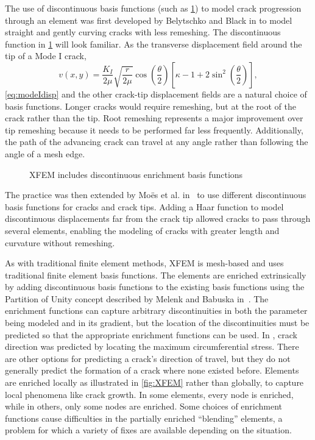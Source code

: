 The use of discontinuous basis functions (such as \cref{fig:CrackEnrich}) to model crack progression through an element was first developed by Belytschko and Black in \cite{belytschko1999elastic} to model straight and gently curving cracks with less remeshing.
The discontinuous function in \cref{fig:CrackEnrich} will look familiar.
As the transverse displacement field around the tip of a Mode I crack,
\begin{equation}
\label{eq:modeIdisp}
v(x,y)=\frac{K_I}{2\mu}\sqrt{\frac{r}{2\mu}}\cos\left(\frac{\theta}{2}\right)\left[\kappa-1+2\sin^2\left(\frac{\theta}{2}\right)\right],
\end{equation}
\cref{eq:modeIdisp} and the other crack-tip displacement fields are a natural choice of basis functions.
Longer cracks would require remeshing, but at the root of the crack rather than the tip.
Root remeshing represents a major improvement over tip remeshing because it needs to be performed far less frequently.
Additionally, the path of the advancing crack can travel at any angle rather than following the angle of a mesh edge.
\begin{figure}[h]
  \centering
  \scalebox{.55}{}
  \caption{XFEM includes discontinuous enrichment basis functions}
  \label{fig:CrackEnrich}
\end{figure}
The practice was then extended by Mo\"es et al. in~\cite{dolbow1999finite} to use different discontinuous basis functions for cracks and crack tips.
Adding a Haar function to model discontinuous displacements far from the crack tip allowed cracks to pass through several elements, enabling the modeling of cracks with greater length and curvature without remeshing.

As with traditional finite element methods, XFEM is mesh-based and uses traditional finite element basis functions.
The elements are enriched extrinsically by adding discontinuous basis functions to the existing basis functions using the Partition of Unity concept described by Melenk and Babuska in~\cite{melenk1996partition}.
The enrichment functions can capture arbitrary discontinuities in both the parameter being modeled and in its gradient, but the location of the discontinuities must be predicted so that the appropriate enrichment functions can be used.
In \cite{dolbow1999finite}, crack direction was predicted by locating the maximum circumferential stress.
There are other options for predicting a crack's direction of travel, but they do not generally predict the formation of a crack where none existed before.
Elements are enriched locally as illustrated in \cref{fig:XFEM} rather than globally, to capture local phenomena like crack growth.
In some elements, every node is enriched, while in others, only some nodes are enriched.
Some choices of enrichment functions cause difficulties in the partially enriched ``blending'' elements, a problem for which a variety of fixes are available depending on the situation.



